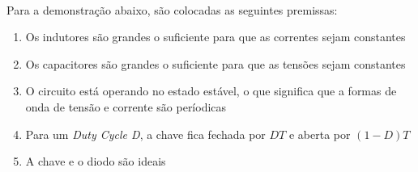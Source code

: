 \noindent
\begin{minipage}{\linewidth}
\label{sepic_topology_closed_sample}
\end{minipage}

\noindent
\begin{minipage}{\linewidth}
\label{sepic_topology_open_sample}
\end{minipage}

\paragraph{}
Para a demonstração abaixo, são colocadas as seguintes premissas:
\begin{enumerate}
    \item Os indutores são grandes o suficiente para que as correntes sejam constantes
    \item Os capacitores são grandes o suficiente para que as tensões sejam constantes
    \item O circuito está operando no estado estável, o que significa que a formas de onda de tensão e corrente são períodicas
    \item Para um \textit{Duty Cycle D}, a chave fica fechada por \textit{$DT$} e aberta por \textit{$(1 - D)T$}
    \item A chave e o diodo são ideais
\end{enumerate}

